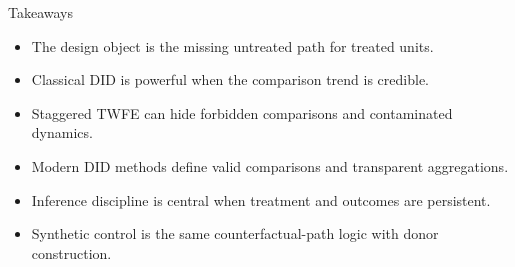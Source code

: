 \documentclass[aspectratio=169,11pt]{beamer}
\newcommand{\1}{\mathbf{1}}
\begin{document}
\begin{frame}{Takeaways}
\begin{itemize}
    \item The design object is the missing untreated path for treated units.
    \item Classical DID is powerful when the comparison trend is credible.
    \item Staggered TWFE can hide forbidden comparisons and contaminated dynamics.
    \item Modern DID methods define valid comparisons and transparent aggregations.
    \item Inference discipline is central when treatment and outcomes are persistent.
    \item Synthetic control is the same counterfactual-path logic with donor construction.
\end{itemize}
\end{frame}
\end{document}
